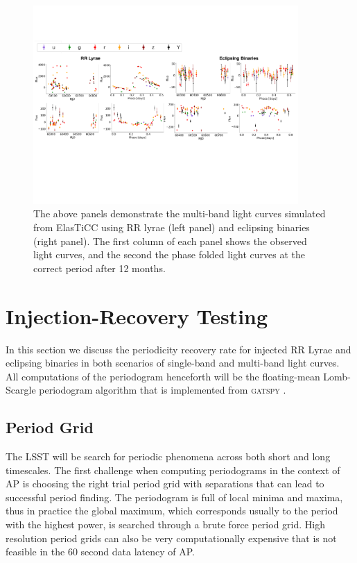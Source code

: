 \documentclass[DM,authoryear,toc]{lsstdoc}
\begin{document}
\begin{figure}
  \includegraphics[width=0.9\textwidth]{figures/lightcurve_demo.pdf}
  \centering 
  \caption{The above panels demonstrate the multi-band light curves simulated from ElasTiCC using RR lyrae (left panel) and eclipsing binaries (right panel).
The first column of each panel shows the observed light curves, and the second the phase folded light curves at the correct period after 12 months.}
   \label{fig:light_curve_demo}
\end{figure}

\section{Injection-Recovery Testing}
In this section we discuss the periodicity recovery rate for injected RR Lyrae and eclipsing binaries in both scenarios of single-band and multi-band light curves.
All computations of the periodogram henceforth will be the floating-mean Lomb-Scargle periodogram algorithm that is implemented from \textsc{gatspy} \citet{VanderPlas:VP2015}.


\subsection{Period Grid}
The LSST will be search for periodic phenomena across both short and long timescales.
The first challenge when computing periodograms in the context of AP is choosing the right trial period grid with separations that can lead to successful period finding.
The periodogram is full of local minima and maxima, thus in practice the global maximum, which corresponds usually to the period with the highest power, is searched through a brute force period grid.
High resolution period grids can also be very computationally expensive that is not feasible in the 60 second data latency of AP.
\end{document}
